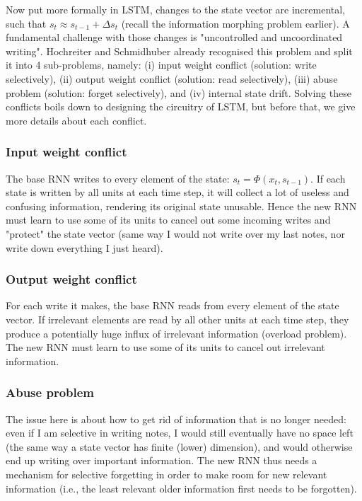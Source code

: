 \documentclass{article}
\begin{document}
Now put more formally in LSTM, changes to the state vector are incremental, such that $s_{t}\approx s_{t-1} + \Delta s_{t}$ (recall the information morphing problem earlier). A fundamental challenge with those changes is "uncontrolled and uncoordinated writing". Hochreiter and Schmidhuber already recognised this problem and split it into 4 sub-problems, namely: (i) input weight conflict (solution: write selectively), (ii) output weight conflict (solution: read selectively), (iii) abuse problem (solution: forget selectively), and (iv) internal state drift. Solving these conflicts boils down to designing the circuitry of LSTM, but before that, we give more details about each conflict.

\subsubsection{Input weight conflict}
The base RNN writes to every element of the state: $s_t=\Phi(x_t, s_{t-1})$. If each state is written by all units at each time step, it will collect a lot of useless and confusing information, rendering its original state unusable. Hence the new RNN must learn to use some of its units to cancel out some incoming writes and "protect" the state vector (same way I would not write over my last notes, nor write down everything I just heard).

\subsubsection{Output weight conflict}
For each write it makes, the base RNN reads from every element of the state vector. If irrelevant elements are read by all other units at each time step, they produce a potentially huge influx of irrelevant information (overload problem). The new RNN must learn to use some of its units to cancel out irrelevant information.

\subsubsection{Abuse problem}
The issue here is about how to get rid of information that is no longer needed: even if I am selective in writing notes, I would still eventually have no space left (the same way a state vector has finite (lower) dimension), and would otherwise end up writing over important information. The new RNN thus needs a mechanism for selective forgetting in order to make room for new relevant information (i.e., the least relevant older information first needs to be forgotten).
\end{document}
